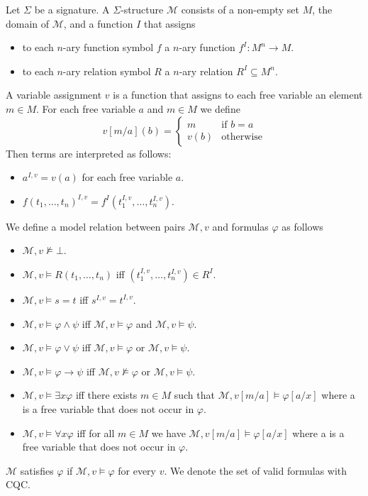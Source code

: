 \documentclass[a4paper,UKenglish,cleveref, autoref, thm-restate]{lipics-v2021}
\begin{document}
\begin{definition}
	Let $\Sigma$ be a signature. A $\Sigma$-structure $\mathcal{M}$ consists of a non-empty set $M$, the domain of $\mathcal{M}$, and a function $I$ that assigns
	\begin{itemize}
		\item to each $n$-ary function symbol $f$ a $n$-ary function $f^I: M^n\to M$.
		\item to each $n$-ary relation symbol $R$ a $n$-ary relation $R^I\subseteq M^n$.
	\end{itemize}
	A variable assignment $v$ is a function that assigns to each free variable an element $m\in M$. For each free variable $a$ and $m\in M$ we define $$v[m/a](b) = \begin{cases}
		m&\text{if $b=a$}\\
		v(b)&\text{otherwise}
	\end{cases}$$
	Then terms are interpreted as follows:
	\begin{itemize}
		\item $a^{I, v} = v(a)$ for each free variable $a$.
		\item $f(t_1,\dots,t_n)^{I, v} = f^I(t_1^{I, v},\dots, t_n^{I, v})$.
	\end{itemize}
	We define a model relation between pairs $\mathcal M, v$ and formulas $\varphi$ as follows
	\begin{itemize}
		\item $\mathcal M, v\not\models\bot$.
		\item $\mathcal M, v\models R(t_1,\dots,t_n)$ iff $(t_1^{I, v},\dots,t_n^{I, v})\in R^I$.
		\item $\mathcal M, v\models s = t$ iff $s^{I, v} = t^{I, v}$.
		\item $\mathcal M, v\models \varphi\wedge \psi$ iff $\mathcal M, v\models\varphi$ and $\mathcal M, v\models\psi$.
		\item $\mathcal M, v\models \varphi\vee\psi$ iff $\mathcal M, v\models\varphi$ or $\mathcal M, v\models\psi$.
		\item $\mathcal M, v\models \varphi\to\psi$ iff $\mathcal M, v\not\models\varphi$ or $\mathcal M, v\models\psi$.
		\item $\mathcal M, v\models\exists x\varphi$ iff there exists $m\in M$ such that $\mathcal M, v[m/a]\models\varphi[a/x]$ where a is a free variable that does not occur in $\varphi$.
		\item $\mathcal M, v\models\forall x\varphi$ iff for all $m\in M$ we have $\mathcal M, v[m/a]\models\varphi[a/x]$ where a is a free variable that does not occur in $\varphi$.
	\end{itemize}
	$\mathcal{M}$ satisfies $\varphi$ if $\mathcal M, v\models\varphi$ for every $v$. We denote the set of valid formulas with CQC.
\end{definition}
\end{document}
